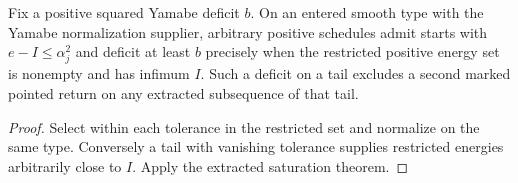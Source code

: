 \begin{proposition}
\label{prop:ed48-deficit}
\leanok
Fix a positive squared Yamabe deficit $b$. On an entered smooth type
with the Yamabe normalization supplier, arbitrary positive schedules admit
starts with $e-I\le\alpha_j^2$ and deficit at least $b$ precisely when
the restricted positive energy set is nonempty and has infimum $I$.
Such a deficit on a tail excludes a second marked pointed return on any
extracted subsequence of that tail.
\end{proposition}
\begin{proof}
\leanok
Select within each tolerance in the restricted set and normalize on the
same type. Conversely a tail with vanishing tolerance supplies restricted
energies arbitrarily close to $I$. Apply the extracted saturation theorem.
\end{proof}
